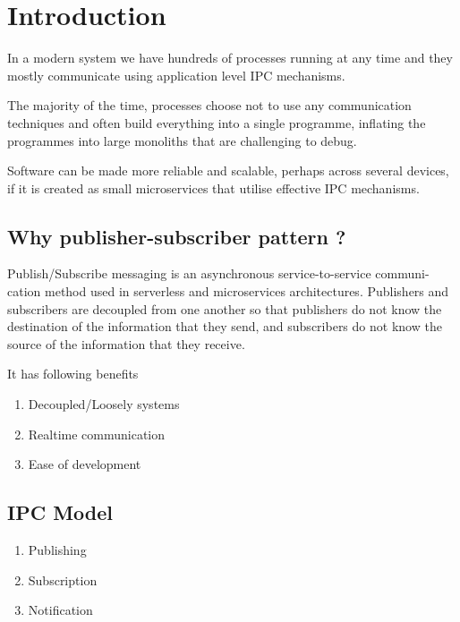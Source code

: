 \documentclass[12pt]{report}
\begin{document}
    \listoffigures
       
	\tableofcontents
	

	\chapter{Introduction}
	In a modern system we have hundreds of processes running at any time and they mostly 
	communicate using application level IPC mechanisms.
	
	The majority of the time, processes choose not to use any communication techniques 
	and often build everything into a single programme, inflating the programmes 
	into large monoliths that are challenging to debug.
	
	Software can be made more reliable and scalable, perhaps across several devices, 
	if it is created as small microservices that utilise effective IPC mechanisms.
	
	\section{Why publisher-subscriber pattern ?}
    Publish/Subscribe messaging is an asynchronous service-to-service communi-
    cation method used in serverless and microservices architectures. Publishers
    and subscribers are decoupled from one another so that publishers do not
    know the destination of the information that they send, and subscribers do
    not know the source of the information that they receive.

    It has following benefits
	\begin{enumerate}
		\item Decoupled/Loosely systems
		\item Real\-time communication
		\item Ease of development
	\end{enumerate}
	
	\section{IPC Model}
	\begin{enumerate}
		\item Publishing
		\item Subscription
		\item Notification
	\end{enumerate}
\end{document}
